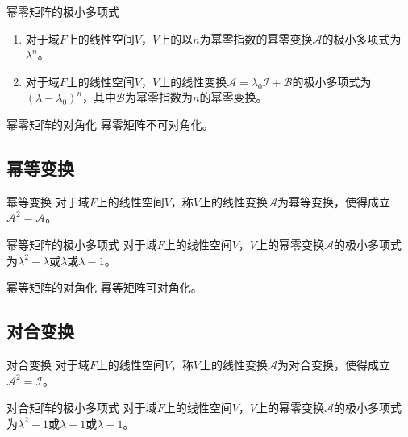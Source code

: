 \documentclass[lang = cn, scheme = chinese, thmcnt = section]{elegantbook}
\begin{document}
\begin{proposition}{幂零矩阵的极小多项式}
	\begin{enumerate}
		\item 对于域$F$上的线性空间$V$，$V$上的以$n$为幂零指数的幂零变换$\mathscr{A}$的极小多项式为$\lambda^n$。
		\item 对于域$F$上的线性空间$V$，$V$上的线性变换$\mathscr{A}=\lambda_0\mathscr{I}+\mathscr{B}$的极小多项式为$(\lambda-\lambda_0)^n$，其中$\mathscr{B}$为幂零指数为$n$的幂零变换。
	\end{enumerate}
\end{proposition}

\begin{proposition}{幂零矩阵的对角化}
	幂零矩阵不可对角化。
\end{proposition}

\subsection{幂等变换}

\begin{definition}{幂等变换}
	对于域$F$上的线性空间$V$，称$V$上的线性变换$\mathscr{A}$为幂等变换，使得成立$\mathscr{A}^2=\mathscr{A}$。
\end{definition}

\begin{proposition}{幂等矩阵的极小多项式}
	对于域$F$上的线性空间$V$，$V$上的幂零变换$\mathscr{A}$的极小多项式为$\lambda^2-\lambda$或$\lambda$或$\lambda-1$。
\end{proposition}

\begin{proposition}{幂等矩阵的对角化}
	幂等矩阵可对角化。
\end{proposition}

\subsection{对合变换}

\begin{definition}{对合变换}
	对于域$F$上的线性空间$V$，称$V$上的线性变换$\mathscr{A}$为对合变换，使得成立$\mathscr{A}^2=\mathscr{I}$。
\end{definition}

\begin{proposition}{对合矩阵的极小多项式}
	对于域$F$上的线性空间$V$，$V$上的幂零变换$\mathscr{A}$的极小多项式为$\lambda^2-1$或$\lambda+1$或$\lambda-1$。
\end{proposition}
\end{document}
